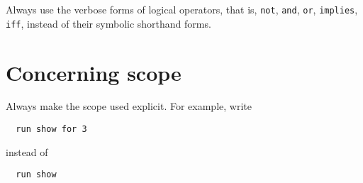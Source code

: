 \documentclass{article}
\begin{document}
Always use the verbose forms of logical operators, that is, \lstinline|not|, \lstinline|and|, \lstinline|or|, \lstinline|implies|, \lstinline|iff|, instead of their symbolic shorthand forms.

\section*{Concerning scope}

Always make the scope used explicit.
For example, write
\begin{lstlisting}
  run show for 3
\end{lstlisting}
instead of
\begin{lstlisting}
  run show
\end{lstlisting}
\end{document}
